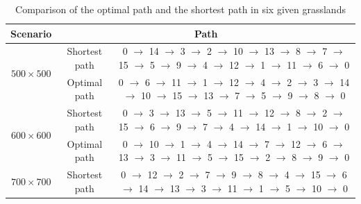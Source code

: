 \documentclass[preprint,5pt]{elsarticle}
\begin{document}
\begin{table}[htbp]
\scriptsize
\centering
\caption{Comparison of the optimal path and the shortest path in six given grasslands}\label{Optimal-Shortest-Path}
\begin{center}
\setlength{\tabcolsep}{0.30em}
\begin{tabular}{c c c}
\hline\hline
Scenario                                & \multicolumn{2}{c}{Path}             \\ \hline
\multicolumn{1}{c}{\multirow{2}{*}{$500\times500$}}  &\multicolumn{1}{c}{Shortest path} &0 $\rightarrow$ 14 $\rightarrow$ 3 $\rightarrow$ 2 $\rightarrow$ 10 $\rightarrow$ 13 $\rightarrow$ 8 $\rightarrow$ 7 $\rightarrow$ 15 $\rightarrow$ 5 $\rightarrow$ 9 $\rightarrow$ 4 $\rightarrow$ 12 $\rightarrow$ 1 $\rightarrow$ 11 $\rightarrow$ 6 $\rightarrow$ 0  \\
                                                    & \multicolumn{1}{c}{{\cellcolor[rgb]{0.729,0.729,0.729}} Optimal path} {\cellcolor[rgb]{0.729,0.729,0.729}} &0 $\rightarrow$ 6 $\rightarrow$ 11 $\rightarrow$ 1 $\rightarrow$ 12 $\rightarrow$ 4 $\rightarrow$ 2 $\rightarrow$ 3 $\rightarrow$ 14 $\rightarrow$ 10 $\rightarrow$ 15 $\rightarrow$ 13 $\rightarrow$ 7 $\rightarrow$ 5 $\rightarrow$ 9 $\rightarrow$ 8 $\rightarrow$ 0 \\
\multirow{2}{*}{$600\times600$}                    & \multicolumn{1}{c}{Shortest path} & 0 $\rightarrow$ 3 $\rightarrow$ 13 $\rightarrow$ 5 $\rightarrow$ 11 $\rightarrow$ 12 $\rightarrow$ 8 $\rightarrow$ 2 $\rightarrow$ 15 $\rightarrow$ 6 $\rightarrow$ 9 $\rightarrow$ 7 $\rightarrow$ 4 $\rightarrow$ 14 $\rightarrow$ 1 $\rightarrow$ 10 $\rightarrow$ 0  \\ %
                                                   & \multicolumn{1}{c}{{\cellcolor[rgb]{0.729,0.729,0.729}}Optimal path} {\cellcolor[rgb]{0.729,0.729,0.729}} &0 $\rightarrow$ 10 $\rightarrow$ 1 $\rightarrow$ 4 $\rightarrow$ 14 $\rightarrow$ 7 $\rightarrow$ 12 $\rightarrow$ 6 $\rightarrow$ 13 $\rightarrow$ 3 $\rightarrow$ 11 $\rightarrow$ 5 $\rightarrow$ 15 $\rightarrow$ 2 $\rightarrow$ 8 $\rightarrow$ 9 $\rightarrow$ 0  \\
\multirow{2}{*}{$700\times700$}                    & \multicolumn{1}{c}{Shortest path} & 0 $\rightarrow$ 12 $\rightarrow$ 2 $\rightarrow$ 7 $\rightarrow$ 9 $\rightarrow$ 8 $\rightarrow$ 4 $\rightarrow$ 15 $\rightarrow$ 6 $\rightarrow$ 14 $\rightarrow$ 13 $\rightarrow$ 3 $\rightarrow$ 11 $\rightarrow$ 1 $\rightarrow$ 5 $\rightarrow$ 10 $\rightarrow$ 0 \\ %

\end{tabular}
\end{center}
\end{table}
\end{document}
